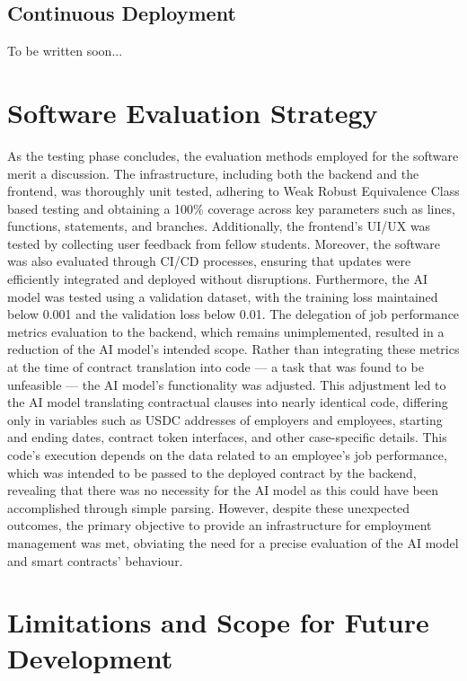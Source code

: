 \subsection{Continuous Deployment}

To be written soon...

\section{Software Evaluation Strategy}

As the testing phase concludes, the evaluation methods employed for the software merit a discussion. The infrastructure, including both the backend and the frontend, was thoroughly unit tested, adhering to Weak Robust Equivalence Class based testing and obtaining a 100\% coverage across key parameters such as lines, functions, statements, and branches. Additionally, the frontend's UI/UX was tested by collecting user feedback from fellow students. Moreover, the software was also evaluated through CI/CD processes, ensuring that updates were efficiently integrated and deployed without disruptions. Furthermore, the AI model was tested using a validation dataset, with the training loss maintained below 0.001 and the validation loss below 0.01. The delegation of job performance metrics evaluation to the backend, which remains unimplemented, resulted in a reduction of the AI model's intended scope. Rather than integrating these metrics at the time of contract translation into code — a task that was found to be unfeasible — the AI model's functionality was adjusted. This adjustment led to the AI model translating contractual clauses into nearly identical code, differing only in variables such as USDC addresses of employers and employees, starting and ending dates, contract token interfaces, and other case-specific details. This code's execution depends on the data related to an employee's job performance, which was intended to be passed to the deployed contract by the backend, revealing that there was no necessity for the AI model as this could have been accomplished through simple parsing. However, despite these unexpected outcomes, the primary objective to provide an infrastructure for employment management was met, obviating the need for a precise evaluation of the AI model and smart contracts' behaviour.

\section{Limitations and Scope for Future Development}

